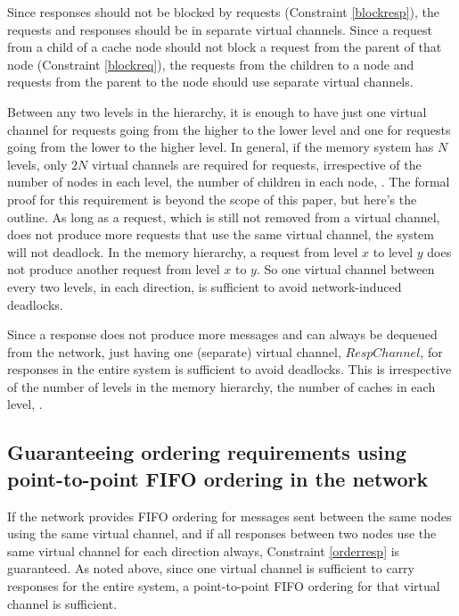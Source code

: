 Since responses should not be blocked by requests (Constraint \ref{blockresp}),
the requests and responses should be in separate virtual channels. Since a
request from a child of a cache node should not block a request from the parent
of that node (Constraint \ref{blockreq}), the requests from the children to a
node and requests from the parent to the node should use separate virtual
channels.

Between any two levels in the hierarchy, it is enough to have just one virtual
channel for requests going from the higher to the lower level and one for
requests going from the lower to the higher level. %
In general, if the memory system has $N$ levels, only $2N$ virtual channels are
required for requests, irrespective of the number of nodes in each level, the
number of children in each node, \etc. The formal proof for this requirement is
beyond the scope of this paper, but here's the outline. As long as a request,
which is still not removed from a virtual channel, does not produce more
requests that use the same virtual channel, the system will not deadlock. In
the memory hierarchy, a request from level $x$ to level $y$ does not produce
another request from level $x$ to $y$. So one virtual channel between every two
levels, in each direction, is sufficient to avoid network-induced deadlocks.

Since a response does not produce more messages and can always be dequeued from
the network, just having one (separate) virtual channel, $RespChannel$, for
responses in the entire system is sufficient to avoid deadlocks. This is
irrespective of the number of levels in the memory hierarchy, the number of
caches in each level, \etc.

\subsection{Guaranteeing ordering requirements using point-to-point FIFO
ordering in the network}

If the network provides FIFO ordering for messages sent between the same nodes
using the same virtual channel, and if all responses between two nodes use the
same virtual channel for each direction always, Constraint \ref{orderresp} is
guaranteed. As noted above, since one virtual channel is sufficient to carry
responses for the entire system, a point-to-point FIFO ordering for that
virtual channel is sufficient.
 
